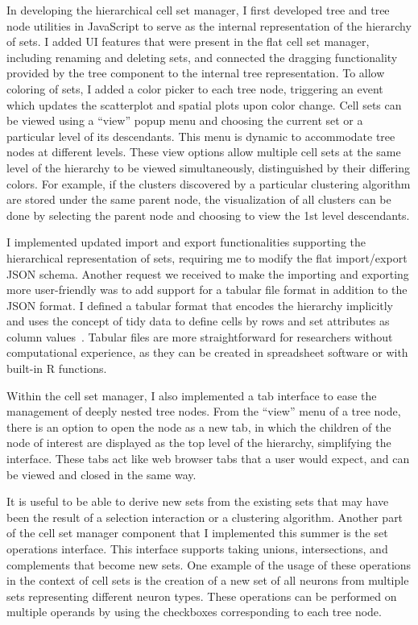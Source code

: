 \documentclass[12pt, letterpaper]{article}
\begin{document}
In developing the hierarchical cell set manager, I first developed tree and tree node utilities in JavaScript to serve as the internal representation of the hierarchy of sets.
I added UI features that were present in the flat cell set manager, including renaming and deleting sets, and connected the dragging functionality provided by the tree component to the internal tree representation.
To allow coloring of sets, I added a color picker to each tree node, triggering an event which updates the scatterplot and spatial plots upon color change.
Cell sets can be viewed using a ``view'' popup menu and choosing the current set or a particular level of its descendants.
This menu is dynamic to accommodate tree nodes at different levels.
These view options allow multiple cell sets at the same level of the hierarchy to be viewed simultaneously, distinguished by their differing colors.
For example, if the clusters discovered by a particular clustering algorithm are stored under the same parent node, the visualization of all clusters can be done by selecting the parent node and choosing to view the 1st level descendants.

I implemented updated import and export functionalities supporting the hierarchical representation of sets, requiring me to modify the flat import/export JSON schema.
Another request we received to make the importing and exporting more user-friendly was to add support for a tabular file format in addition to the JSON format.
I defined a tabular format that encodes the hierarchy implicitly and uses the concept of tidy data to define cells by rows and set attributes as column values~\cite{wickham2014tidy}.
Tabular files are more straightforward for researchers without computational experience, as they can be created in spreadsheet software or with built-in R functions.

Within the cell set manager, I also implemented a tab interface to ease the management of deeply nested tree nodes.
From the ``view'' menu of a tree node, there is an option to open the node as a new tab, in which the children of the node of interest are displayed as the top level of the hierarchy, simplifying the interface.
These tabs act like web browser tabs that a user would expect, and can be viewed and closed in the same way.

It is useful to be able to derive new sets from the existing sets that may have been the result of a selection interaction or a clustering algorithm.
Another part of the cell set manager component that I implemented this summer is the set operations interface.
This interface supports taking unions, intersections, and complements that become new sets.
One example of the usage of these operations in the context of cell sets is the creation of a new set of all neurons from multiple sets representing different neuron types.
These operations can be performed on multiple operands by using the checkboxes corresponding to each tree node.
\end{document}
